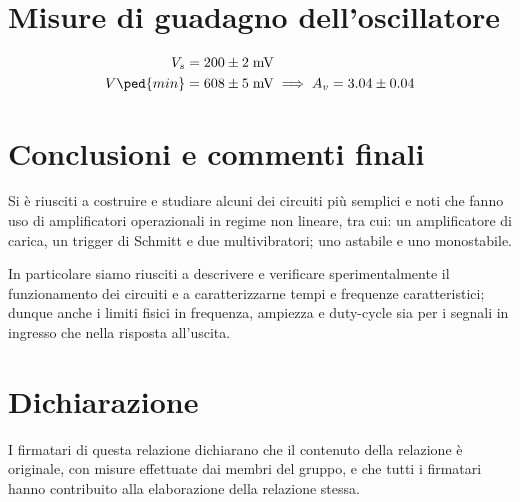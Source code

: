 \documentclass[10pt, a4paper, italian]{article}
\begin{document}
\section{Misure di guadagno dell'oscillatore}
\begin{align*}
V_s &= 200 \pm 2 \; \si{m\V} \\
V\ped{min} &= 608 \pm 5 \; \si{m\V} \implies  A_v = 3.04 \pm 0.04
\end{align*}
\section*{Conclusioni e commenti finali}
Si è riusciti a costruire e studiare alcuni dei circuiti più semplici e noti
che fanno uso di amplificatori operazionali in regime non lineare, tra cui:
un amplificatore di carica, un trigger di Schmitt e due multivibratori; uno
astabile e uno monostabile.

In particolare siamo riusciti a descrivere e verificare sperimentalmente il
funzionamento dei circuiti e a caratterizzarne tempi e frequenze
caratteristici; dunque anche i limiti fisici in frequenza, ampiezza e
duty-cycle sia per i segnali in ingresso che nella risposta all'uscita.

\section*{Dichiarazione}
I firmatari di questa relazione dichiarano che il contenuto della relazione \`e
originale, con misure effettuate dai membri del gruppo, e che tutti i firmatari
hanno contribuito alla elaborazione della relazione stessa.
\end{document}
